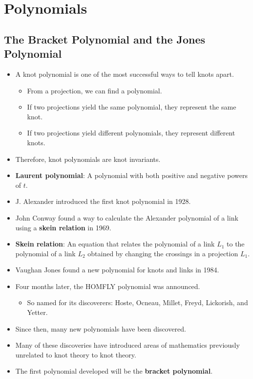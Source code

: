 \documentclass[titlepage]{article}
\numberwithin{figure}{section}
\numberwithin{table}{section}
\numberwithin{equation}{section}
\begin{document}
\section{Polynomials}\label{sse:polynomials}
\subsection{The Bracket Polynomial and the Jones Polynomial}\label{sss:Bracket}
\begin{itemize}
    \item A knot polynomial is one of the most successful ways to tell knots apart.
    \begin{itemize}
        \item From a projection, we can find a polynomial.
        \item If two projections yield the same polynomial, they represent the same knot.
        \item If two projections yield different polynomials, they represent different knots.
    \end{itemize}
    \item Therefore, knot polynomials are knot invariants.
    \item \textbf{Laurent polynomial}: A polynomial with both positive and negative powers of $t$.
    \item J. Alexander introduced the first knot polynomial in 1928.
    \item John Conway found a way to calculate the Alexander polynomial of a link using a \textbf{skein relation} in 1969.
    \item \textbf{Skein relation}: An equation that relates the polynomial of a link $L_1$ to the polynomial of a link $L_2$ obtained by changing the crossings in a projection $L_1$.
    \item Vaughan Jones found a new polynomial for knots and links in 1984.
    \item Four months later, the HOMFLY polynomial was announced.
    \begin{itemize}
        \item So named for its discoverers: Hoste, Ocneau, Millet, Freyd, Lickorish, and Yetter.
    \end{itemize}
    \item Since then, many new polynomials have been discovered.
    \item Many of these discoveries have introduced areas of mathematics previously unrelated to knot theory to knot theory.
    \item The first polynomial developed will be the \textbf{bracket polynomial}.

\end{itemize}
\end{document}
